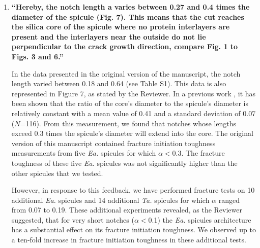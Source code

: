 \documentclass[11pt,letterpaper]{report}
\makeatletter
\newcommand{\TA}{\textit{Ta.\@}\xspace}
\newcommand{\EA}{\textit{Ea.\@}\xspace}
\makeatother
\begin{document}
\begin{enumerate}[label=\textit{1.\arabic*},wide, labelwidth=!, labelindent=0pt]
Through changes \ref{Mc01} and \ref{Mc02} we have pointed out both in the introduction and the abstract that for very short notches, the \EA spicule's architecture does appear to increase their fracture initiation toughness by up to a factor of 10.

Through changes \ref{Mc03} and \ref{Mc04} we have described these new results in detail. Specifically, we point out that for $\alpha>$0.1 the fracture initiation toughness of the \EA spicules is not significantly different than that of the \TA spicules. However, for specimens in which $\alpha<$0.1 the \EA spicules display a substantial increase in fracture initiation toughness. We then remark that this observed increase is consistent with a previously proposed model for fracture initiation toughness enhancement \cite{fratzl2007hindered, kolednik2014improvements, kolednik2011bioinspired}.

\item \label{r1c3} {\bf ``Hereby, the notch length a varies between 0.27 and 0.4 times the diameter of the spicule (Fig. 7). This means that the cut reaches the silica core of the spicule where no protein interlayers are present and the interlayers near the outside do not lie perpendicular to the crack growth direction, compare Fig. 1 to Figs. 3 and 6.''}

In the data presented in the original version of the manuscript, the notch length varied between 0.18 and 0.64 (see Table S1). This data is also represented in Figure 7, as stated by the Reviewer. In a previous work \cite{monn2015new}, it has been shown that the ratio of the core's diameter to the spicule's diameter is relatively constant with a mean value of 0.41 and a standard deviation of 0.07 ($N$=116). From this measurement, we found that notches whose lengths exceed 0.3 times the spicule's diameter will extend into the core. The original version of this manuscript contained fracture initiation toughness measurements from five \EA spicules for which $\alpha<$0.3. The fracture toughness of these five \EA spicules was not significantly higher than the other spicules that we tested.

However, in response to this feedback, we have performed fracture tests on 10 additional \EA spicules and 14 additional \TA spicules for which $\alpha$ ranged from 0.07 to 0.19. These additional experiments revealed, as the Reviewer suggested, that for very short notches ($\alpha<$0.1) the \EA spicules architecture has a substantial effect on its fracture initiation toughness. We observed up to a ten-fold increase in fracture initiation toughness in these additional tests. 


\end{enumerate}
\end{document}
